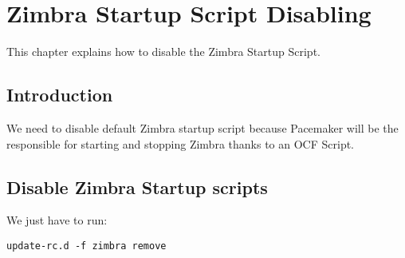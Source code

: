 

\chapter{Zimbra Startup Script Disabling}
This chapter explains how to disable the Zimbra Startup Script.

\section {Introduction}
We need to disable default Zimbra startup script because Pacemaker will be the responsible for starting and stopping Zimbra thanks to an OCF Script.

\section {Disable Zimbra Startup scripts}
We just have to run:
\begin{verbatim}
update-rc.d -f zimbra remove
\end{verbatim}
